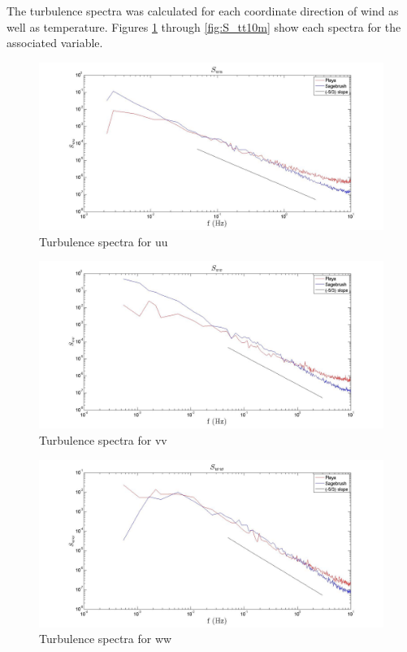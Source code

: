 \documentclass[]{article}
\begin{document}
The turbulence spectra was calculated for each coordinate direction of wind as well as temperature. Figures \ref{fig:S_uu10m} through \ref{fig:S_tt10m} show each spectra for the associated variable.
\begin{figure}[h]
	\centering
	\includegraphics[width=\textwidth]{S_uu10m.jpg}
	\caption{Turbulence spectra for uu}
	\label{fig:S_uu10m}
\end{figure}
\begin{figure}[h]
	\centering
	\includegraphics[width=\textwidth]{S_vv10m.jpg}
	\caption{Turbulence spectra for vv}
	\label{fig:S_vv10m}
\end{figure}
\begin{figure}[h]
	\centering
	\includegraphics[width=\textwidth]{S_ww10m.jpg}
	\caption{Turbulence spectra for ww}
	\label{fig:S_ww10m}
\end{figure}
\end{document}
